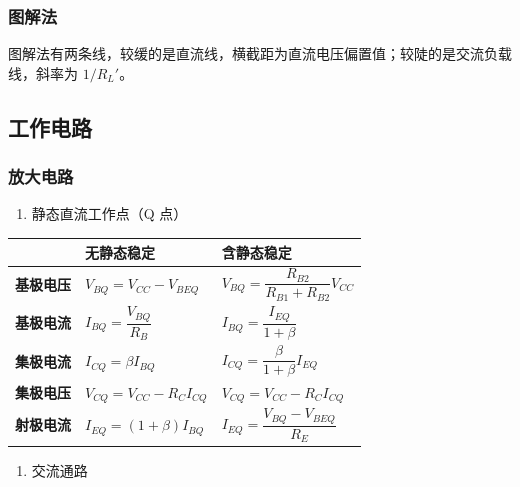 \documentclass[UTF8,fontset=fandol,zihao=5]{ctexart}
\begin{document}
\subsubsection{图解法}

图解法有两条线，较缓的是直流线，横截距为直流电压偏置值；较陡的是交流负载线，斜率为 $1/R_L'$。

\subsection{工作电路}

\subsubsection{放大电路}

\begin{enumerate}
  \item 静态直流工作点（Q 点）
\end{enumerate}

\begin{center}
\renewcommand{\arraystretch}{1.35}
\begin{tabularx}{0.98\textwidth}{>{\bfseries}p{2.1cm}XX}
\toprule
 & 无静态稳定 & 含静态稳定 \\
\midrule
基极电压 & $V_{BQ}=V_{CC}-V_{BEQ}$ & $V_{BQ}=\dfrac{R_{B2}}{R_{B1}+R_{B2}}V_{CC}$ \\
基极电流 & $I_{BQ}=\dfrac{V_{BQ}}{R_B}$ & $I_{BQ}=\dfrac{I_{EQ}}{1+\beta}$ \\
集极电流 & $I_{CQ}=\beta I_{BQ}$ & $I_{CQ}=\dfrac{\beta}{1+\beta}I_{EQ}$ \\
集极电压 & $V_{CQ}=V_{CC}-R_CI_{CQ}$ & $V_{CQ}=V_{CC}-R_CI_{CQ}$ \\
射极电流 & $I_{EQ}=(1+\beta)I_{BQ}$ & $I_{EQ}=\dfrac{V_{BQ}-V_{BEQ}}{R_E}$ \\
\bottomrule
\end{tabularx}
\end{center}

\begin{enumerate}[resume]
  \item 交流通路
\end{enumerate}
\end{document}
